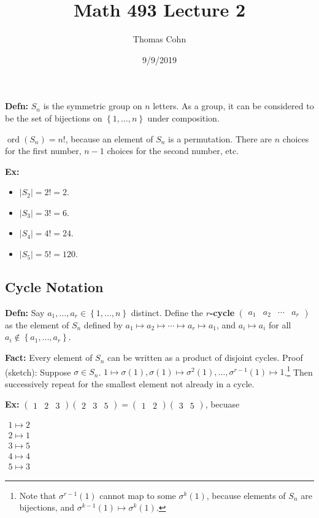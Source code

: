 \documentclass[10pt,letterpaper]{article}
\author{Thomas Cohn}
\title{Math 493 Lecture 2}
\date{9/9/2019} %
\newcommand{\n}{\hfill\break}
\newcommand{\hangblock}[2]{\par\noindent\settowidth{\hangindent}{\textbf{#1: }}\textbf{#1: }\!\!\!#2}
\newcommand{\defn}[1]{\hangblock{Defn}{#1}}
\newcommand{\ex}[1]{\hangblock{Ex}{#1}}
\newcommand{\inlineeq}[1]{\centerline{$\displaystyle #1$}}
\newcommand{\card}[1]{\left|#1\right|}
\newcommand{\set}[1]{\left\{#1\right\}}
\DeclareMathOperator{\ord}{ord}
\newcommand{\cycle}[1]{\begin{pmatrix}#1\end{pmatrix}}
\begin{document}
\maketitle
\setlength\RaggedRightParindent{\parindent}
\RaggedRight

\defn{
	$S_{n}$ is the symmetric group on $n$ letters. As a group, it can be considered to be the set of bijections on $\set{1,\ldots,n}$ under composition.
}

\par\noindent
$\ord(S_{n})=n!$, because an element of $S_{n}$ is a permutation. There are $n$ choices for the first number, $n-1$ choices for the second number, etc.\n

\ex{
	\begin{itemize}
		\item $\card{S_{2}}=2!=2$.
		\item $\card{S_{3}}=3!=6$.
		\item $\card{S_{4}}=4!=24$.
		\item $\card{S_{5}}=5!=120$.
	\end{itemize}
}

\subsection*{Cycle Notation}

\defn{
	Say $a_{1},\ldots,a_{r}\in\set{1,\ldots,n}$ distinct. Define the \textbf{$r$-cycle} $\cycle{a_{1} & a_{2} & \cdots & a_{r}}$ as the element of $S_{n}$ defined by $a_{1}\mapsto{}a_{2}\mapsto\cdots\mapsto{}a_{r}\mapsto{}a_{1}$, and $a_{i}\mapsto{}a_{i}$ for all $a_{i}\not\in\set{a_{1},\ldots,a_{r}}$.\n
}

\hangblock{Fact}{
	Every element of $S_{n}$ can be written as a product of disjoint cycles.\n
	Proof (sketch): Suppose $\sigma\in{}S_{n}$. $1\mapsto\sigma(1),\sigma(1)\mapsto\sigma^{2}(1),\ldots,\sigma^{r-1}(1)\mapsto{}1$.\footnote{Note that $\sigma^{r-1}(1)$ cannot map to some $\sigma^{k}(1)$, because elements of $S_{n}$ are bijections, and $\sigma^{k-1}(1)\mapsto\sigma^{k}(1)$.} Then successively repeat for the smallest element not already in a cycle.\n
}

\ex{
	$\cycle{1 & 2 & 3}\cycle{2 & 3 & 5}=\cycle{1 & 2}\cycle{3 & 5}$, becuase\n
	\inlineeq{
		\begin{array}{l}
			1\mapsto{}2\\
			2\mapsto{}1\\
			3\mapsto{}5\\
			4\mapsto{}4\\
			5\mapsto{}3
		\end{array}
	}
}
\end{document}
